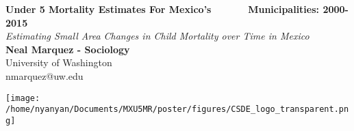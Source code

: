\documentclass[a0,portrait]{a0poster}
\begin{document}


\begin{minipage}[b]{0.67\linewidth}
\veryHuge \color{Crimson} \textbf{Under 5 Mortality Estimates For Mexico's ~~~~~~Municipalities: 2000-2015} \color{Black}\\ %
\Huge\textit{Estimating Small Area Changes in Child Mortality over Time in Mexico}\\[2cm] %
\huge \textbf{Neal Marquez - Sociology}\\[0.5cm] %
\huge University of Washington\\[0.4cm] %
\Large nmarquez@uw.edu\\
\end{minipage}
%
\begin{minipage}[b]{0.33\linewidth}
\texttt{[image: /home/nyanyan/Documents/MXU5MR/poster/figures/CSDE\_logo\_transparent.png]}\\
\end{minipage}

\vspace{1cm} %



\end{document}
